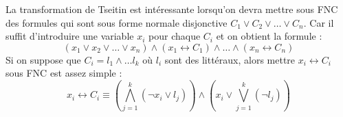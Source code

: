 La transformation de Tseitin est intéressante lorsqu'on devra mettre sous FNC des formules qui sont sous forme normale disjonctive $C_1\vee C_2\vee\dots\vee C_n$. Car il suffit d'introduire une variable $x_i$ pour chaque $C_i$ et on obtient la formule :
\begin{equation*}
    (x_1\vee x_2\vee\dots\vee x_n)\wedge(x_1\leftrightarrow C_1)\wedge\dots\wedge(x_n \leftrightarrow C_n)
\end{equation*} 
Si on suppose que $C_i = l_1\wedge\dots l_k$ où $l_i$ sont des littéraux, alors mettre $x_i\leftrightarrow C_i$ sous FNC est assez simple :
\begin{equation*}
    x_i \leftrightarrow C_i \equiv (\bigwedge_{j=1}^{k}(\neg x_i \vee l_j)) \wedge (x_i \vee \bigvee_{j=1}^{k}(\neg l_j))
\end{equation*}

